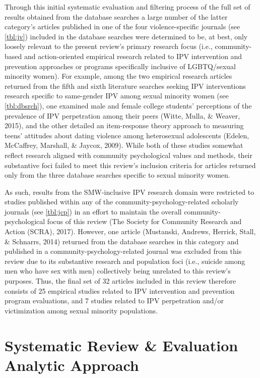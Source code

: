 \documentclass[11pt,]{tufte-book}
\begin{document}
Through this initial systematic evaluation and filtering process of the
full set of results obtained from the database searches a large number
of the latter category's articles published in one of the four
violence-specific journals (see \cref{tbl:jv}) included
in the database searches were determined to be, at best, only loosely
relevant to the present review's primary research focus (i.e.,
community-based and action-oriented empirical research related to IPV
intervention and prevention approaches or programs specifically
inclusive of LGBTQ/sexual minority women). For example, among the two
empirical research articles returned from the fifth and sixth literature
searches seeking IPV interventions research specific to same-gender IPV
among sexual minority women (see \cref{tbl:dbsrch}), one
examined male and female college students' perceptions of the prevalence
of IPV perpetration among their peers (Witte, Mulla, \& Weaver, 2015),
and the other detailed an item-response theory approach to measuring
teens' attitudes about dating violence among heterosexual adolescents
(Edelen, McCaffrey, Marshall, \& Jaycox, 2009). While both of these
studies somewhat reflect research aligned with community psychological
values and methods, their substantive foci failed to meet this review's
inclusion criteria for articles returned only from the three database
searches specific to sexual minority women.

As such, results from the SMW-inclusive IPV research domain were
restricted to studies published within any of the
community-psychology-related scholarly journals (see
\cref{tbl:jcp}) in an effort to maintain the overall
community-psychological focus of this review (The Society for Community
Research and Action (SCRA), 2017). However, one article (Mustanski,
Andrews, Herrick, Stall, \& Schnarrs, 2014) returned from the database
searches in this category and published in a
community-psychology-related journal was excluded from this review due
to its substantive research and population foci (i.e., suicide among men
who have sex with men) collectively being unrelated to this review's
purposes. Thus, the final set of 32 articles included in this review
therefore consists of 25 empirical studies related to IPV intervention
and prevention program evaluations, and 7 studies related to IPV
perpetration and/or victimization among sexual minority populations.

\section{Systematic Review \& Evaluation Analytic
Approach}\label{systematic-review-evaluation-analytic-approach}
\end{document}
